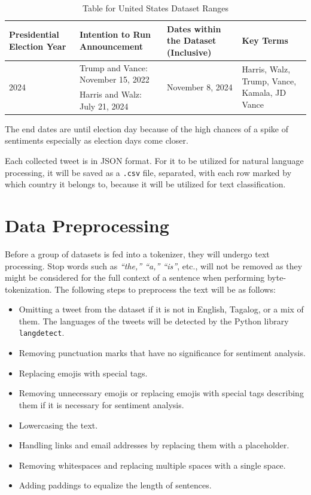 \begin{table}[h]
    \centering
    \begin{tabularx}{\textwidth}{X|X|X|X}
        \textbf{Presidential Election Year} & \textbf{Intention to Run Announcement} & \textbf{Dates within the Dataset (Inclusive)} & \textbf{Key Terms}\\
        \hline\hline
        \multirow{2}{*}{2024}& Trump and Vance: November 15, 2022 & \multirow{2}{*}{November 8, 2024} & \multirow{2}{4cm}{Harris, Walz, Trump, Vance, Kamala, JD Vance} \\
        & Harris and Walz: July 21, 2024 & & \\
    \end{tabularx}
    \caption{Table for United States Dataset Ranges}
\end{table}

The end dates are until election day because of the high chances of a spike of sentiments especially as election days come closer.

Each collected tweet is in JSON format. For it to be utilized for natural language processing, it will be saved as a \texttt{.csv} file, separated, with each row marked by which country it belongs to, because it will be utilized for text classification.

\section{Data Preprocessing}
Before a group of datasets is fed into a tokenizer, they will undergo text processing.  Stop words such as \emph{“the,” “a,” “is”}, etc., will not be removed as they might be considered for the full context of a sentence when performing byte-tokenization. The following steps to preprocess the text will be as follows:

\begin{itemize}
    \item Omitting a tweet from the dataset if it is not in English, Tagalog, or a mix of them. The languages of the tweets will be detected by the Python library \texttt{langdetect}.
    \item Removing punctuation marks that have no significance for sentiment analysis.
    \item Replacing emojis with special tags.
    \item Removing unnecessary emojis or replacing emojis with special tags describing them if it is necessary for sentiment analysis.
    \item Lowercasing the text.
    \item Handling links and email addresses by replacing them with a placeholder.
    \item Removing whitespaces and replacing multiple spaces with a single space.
    \item Adding paddings to equalize the length of sentences.
\end{itemize}

